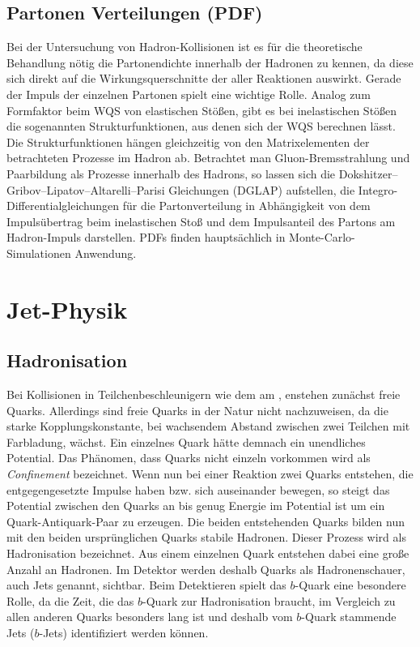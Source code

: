 \subsection{Partonen Verteilungen (PDF)}
Bei der Untersuchung von Hadron-Kollisionen ist es für die theoretische Behandlung nötig die Partonendichte innerhalb der Hadronen zu kennen, da diese sich direkt auf die Wirkungsquerschnitte der aller Reaktionen auswirkt. Gerade der Impuls der einzelnen Partonen spielt eine wichtige Rolle. Analog zum Formfaktor beim WQS von elastischen Stößen, gibt es bei inelastischen Stößen die sogenannten Strukturfunktionen, aus denen sich der WQS berechnen lässt. Die Strukturfunktionen hängen gleichzeitig von den Matrixelementen der betrachteten Prozesse im Hadron ab. Betrachtet man Gluon-Bremsstrahlung und Paarbildung als Prozesse innerhalb des Hadrons, so lassen sich die Dokshitzer–Gribov–Lipatov–Altarelli–Parisi Gleichungen (DGLAP) aufstellen, die Integro-Differentialgleichungen für die Partonverteilung in Abhängigkeit von dem Impulsübertrag beim inelastischen Stoß und dem Impulsanteil des Partons am Hadron-Impuls darstellen. PDFs finden hauptsächlich in Monte-Carlo-Simulationen Anwendung.

\section{Jet-Physik}
\subsection{Hadronisation}
Bei Kollisionen in Teilchenbeschleunigern wie dem \lhc am \cern, enstehen zunächst freie Quarks. Allerdings sind freie Quarks in der Natur nicht nachzuweisen, da die starke Kopplungskonstante, bei wachsendem Abstand zwischen zwei Teilchen mit Farbladung, wächst. Ein einzelnes Quark hätte demnach ein unendliches Potential. Das Phänomen, dass Quarks nicht einzeln vorkommen wird als \emph{Confinement} bezeichnet. Wenn nun bei einer Reaktion zwei Quarks entstehen, die entgegengesetzte Impulse haben bzw. sich auseinander bewegen, so steigt das Potential zwischen den Quarks an bis genug Energie im Potential ist um ein Quark-Antiquark-Paar zu erzeugen. Die beiden entstehenden Quarks bilden nun mit den beiden ursprünglichen Quarks stabile Hadronen. Dieser Prozess wird als Hadronisation bezeichnet. Aus einem einzelnen Quark entstehen dabei eine große Anzahl an Hadronen. Im Detektor werden deshalb Quarks als Hadronenschauer, auch Jets genannt, sichtbar. Beim Detektieren spielt das $b$-Quark eine besondere Rolle, da die Zeit, die das $b$-Quark zur Hadronisation braucht, im Vergleich zu allen anderen Quarks besonders lang ist und deshalb vom $b$-Quark stammende Jets ($b$-Jets) identifiziert werden können.
